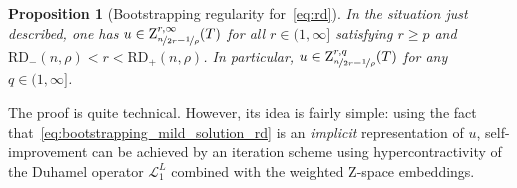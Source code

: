 \documentclass[11pt, leqno]{amsart}
\newtheorem{proposition}[theorem]{Proposition}
\theoremstyle{definition}
\newcommand{\Z}{\mathrm{Z}}
\newcommand{\Soll}{\mathcal{L}}
\newcommand{\RD}{\mathrm{RD}}
\begin{document}
	\begin{proposition}[Bootstrapping regularity for~\eqref{eq:rd}]
		\label{prop:RD_bootstrapping}
		In the situation just described, one has $u \in \Z^{r,\infty}_{\nicefrac{n}{2r} - \nicefrac{1}{\rho}}(T)$ for all $r \in (1,\infty]$ satisfying $r \geq p$ and $\RD_{-}(n,\rho) < r < \RD_{+}(n,\rho)$. In particular, $u \in \Z^{r,q}_{\nicefrac{n}{2r} - \nicefrac{1}{\rho}}(T)$ for any $q \in (1,\infty]$.
	\end{proposition}

	The proof is quite technical. However, its idea is fairly simple: using the fact that~\eqref{eq:bootstrapping_mild_solution_rd} is an \emph{implicit} representation of $u$, self-improvement can be achieved by an iteration scheme using hypercontractivity of the Duhamel operator $\Soll^L_1$ combined with the weighted $\Z$-space embeddings.
\end{document}
